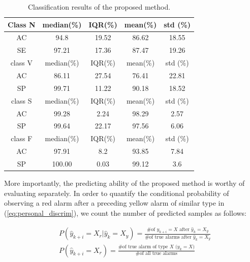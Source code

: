 \begin{table}[thpb]
	\caption{Classification results of the proposed method.}
	\centering
	\begin{tabular}{|c||c||c||c||c|}
		\hline
		Class N & median(\%) & IQR(\%) & mean(\%)& std (\%) \\ 
		\hline 
		AC & 94.8& 19.52 & 86.62 & 18.55\\ 
		\hline 
		SE & 97.21  & 17.36 & 87.47 &19.26 \\ 
		\hline 
		class V & median(\%) & IQR(\%) & mean(\%)& std (\%) \\ 
		\hline 
		AC & 86.11 & 27.54 & 76.41 & 22.81 \\ 
		\hline 
		SP & 99.71 & 11.22 & 90.18 & 18.52 \\ 
		\hline 
		class S & median(\%) & IQR(\%) & mean(\%)& std (\%)\\ 
		\hline 
		AC & 99.28 & 2.24& 98.29&2.57 \\ 
		\hline 
		SP & 99.64& 22.17& 97.56 & 6.06\\ 
		\hline 
		class F & median(\%) & IQR(\%) & mean(\%)& std (\%) \\ 
		\hline 
		AC & 97.91 & 8.2&93.85&7.84\\ 
		\hline 
		SP & 100.00 & 0.03&99.12&3.6\\ 
		\hline 
		\hline
	\end{tabular} 
	\label{table:result1}
\end{table}

More importantly, the predicting ability of the proposed method is worthy of evaluating separately. In order to quantify the conditional probability of observing a red alarm after a preceding yellow alarm of similar type in (\ref{eq:personal_discrim}), we count the number of predicted samples as follows:

\begin{align}
\nonumber 
&P(\hat{y}_{k+i}=X_r|\hat{y}_{k}=X_y)=\frac{\text{\# of $y_{k+i}=X$ after $\hat{y}_k=X_y$}}{\text{\# of true alarms after $\hat{y}_k=X_y$}} \\
&P(\hat{y}_{k+i}=X_r)=\frac{\text{\# of true alarm of type $X$ ($y_{k}=X$)}}{\text{\# of all true alarms}} 
\end{align}

